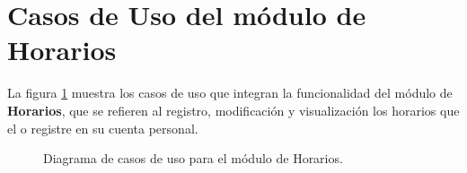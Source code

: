 \section{Casos de Uso del módulo de Horarios}

La figura \ref{fig:casosUso:generacionConvocatoria} muestra los casos de uso que integran la funcionalidad del módulo de \textbf{Horarios}, que se refieren al registro, modificación y visualización los horarios que el  o   registre en su cuenta personal.

\begin{figure}[h!]
	\begin{center}
		\caption{Diagrama de casos de uso para el módulo de Horarios. \label{fig:casosUso:generacionConvocatoria}}
	\end{center}
\end{figure}

